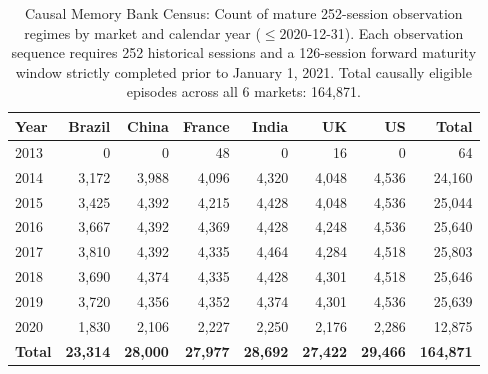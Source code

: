 \begin{table}[ht]
\centering
\small
\begin{tabular}{lrrrrrrr}
\toprule
\textbf{Year} & \textbf{Brazil} & \textbf{China} & \textbf{France} & \textbf{India} & \textbf{UK} & \textbf{US} & \textbf{Total} \\
\midrule
2013 & 0 & 0 & 48 & 0 & 16 & 0 & 64 \\
2014 & 3,172 & 3,988 & 4,096 & 4,320 & 4,048 & 4,536 & 24,160 \\
2015 & 3,425 & 4,392 & 4,215 & 4,428 & 4,048 & 4,536 & 25,044 \\
2016 & 3,667 & 4,392 & 4,369 & 4,428 & 4,248 & 4,536 & 25,640 \\
2017 & 3,810 & 4,392 & 4,335 & 4,464 & 4,284 & 4,518 & 25,803 \\
2018 & 3,690 & 4,374 & 4,335 & 4,428 & 4,301 & 4,518 & 25,646 \\
2019 & 3,720 & 4,356 & 4,352 & 4,374 & 4,301 & 4,536 & 25,639 \\
2020 & 1,830 & 2,106 & 2,227 & 2,250 & 2,176 & 2,286 & 12,875 \\
\midrule
\textbf{Total} & \textbf{23,314} & \textbf{28,000} & \textbf{27,977} & \textbf{28,692} & \textbf{27,422} & \textbf{29,466} & \textbf{164,871} \\
\bottomrule
\end{tabular}
\caption{Causal Memory Bank Census: Count of mature 252-session observation regimes by market and calendar year ($\le 2020$-12-31). Each observation sequence requires 252 historical sessions and a 126-session forward maturity window strictly completed prior to January 1, 2021. Total causally eligible episodes across all 6 markets: 164,871.}
\label{tab:memory_bank_census}
\end{table}
